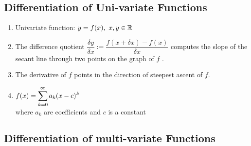 \subsection{Differentiation of Uni-variate Functions}

\begin{enumerate}
    \item
    \begin{definition}
        Univariate function: $y = f(x),\ x, y \in \mathbb{R}$
        \hfill \cite{mfml/book/mml/Deisenroth-Faisal-Ong}
    \end{definition}

    \item
    \begin{definition}
        The difference quotient
        $
            \dfrac{\delta y}{\delta x}
            := \dfrac{f(x + \delta x) - f(x)}{\delta x}
        $
        computes the slope of the secant line through two points on the graph of $f$ .
        \hfill \cite{mfml/book/mml/Deisenroth-Faisal-Ong}
    \end{definition}

    \item The derivative of $f$ points in the direction of steepest ascent of $f$.
    \hfill \cite{mfml/book/mml/Deisenroth-Faisal-Ong}

    \item
    \begin{definition}
        $
            f(x) = \displaystyle\sum_{k=0}^{\infty} a_k (x-c)^k
        $
        \\
        where $a_k$ are coefficients and $c$ is a constant
    \end{definition}

\end{enumerate}




\subsection{Differentiation of multi-variate Functions}

